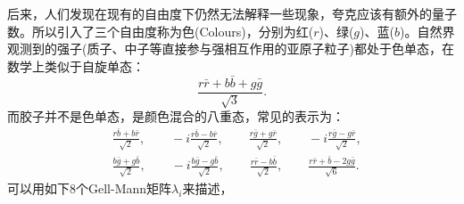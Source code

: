 后来，人们发现在现有的自由度下仍然无法解释一些现象，夸克应该有额外的量子数。所以引入了三个自由度称为色(Colours)，分别为红($r$)、绿($g$)、蓝($b$)。自然界观测到的强子(质子、中子等直接参与强相互作用的亚原子粒子)都处于色单态，在数学上类似于自旋单态\cite{griffiths2004introduction}：
\begin{equation*}
	\frac{r\bar{r}+b\bar{b}+g\bar{g}}{\sqrt{3}}.
\end{equation*}
\newpage
而胶子并不是色单态，是颜色混合的八重态，常见的表示为：
\begin{equation*}
\begin{split}
	&\frac{r\bar{b}+b\bar{r}}{\sqrt{2}},\qquad -i\frac{r\bar{b}-b\bar{r}}{\sqrt{2}},\qquad
	\frac{r\bar{g}+g\bar{r}}{\sqrt{2}},\qquad -i\frac{r\bar{g}-g\bar{r}}{\sqrt{2}},\\[2ex]
	&\frac{b\bar{g}+g\bar{b}}{\sqrt{2}},\qquad -i\frac{b\bar{g}-g\bar{b}}{\sqrt{2}},\qquad
	\frac{r\bar{r}-b\bar{b}}{\sqrt{2}},\qquad \frac{r\bar{r}+\bar{b}-2g\bar{g}}{\sqrt{6}}.
\end{split}
\end{equation*}
可以用如下8个Gell-Mann矩阵$\lambda_{i}$来描述，
